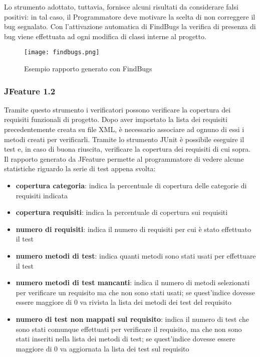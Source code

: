 \documentclass[a4paper,11pt]{article}
\begin{document}
Lo strumento adottato, tuttavia, fornisce alcuni risultati da considerare falsi positivi: in tal caso, il Programmatore deve motivare la scelta di non correggere il bug segnalato. 
Con l'attivazione automatica di FindBugs la verifica di presenza di bug viene effettuata ad ogni modifica di classi interne al progetto.
\begin{figure}[h!]
\begin{center}
\texttt{[image: findbugs.png]}
\end{center}
\caption{Esempio rapporto generato con FindBugs}
\end{figure}

\subsubsection{JFeature 1.2}

Tramite questo strumento i verificatori possono verificare la copertura dei requisiti funzionali di progetto. Dopo aver importato la lista dei requisiti precedentemente creata su file XML, 
\`e necessario associare ad ognuno di essi i metodi creati per verificarli. Tramite lo strumento JUnit \`e possibile eseguire il test e, in caso di buona riuscita, verificare la copertura
dei requisiti di cui sopra. Il rapporto generato da JFeature permette al programmatore di vedere alcune statistiche riguardo la serie di test appena svolta:
\begin{itemize}
\item \textbf{copertura categoria}: indica la percentuale di copertura delle categorie di requisiti indicata
\item \textbf{copertura requisiti}: indica la percentuale di copertura sui requisiti
\item \textbf{numero di requisiti}: indica il numero di requisiti per cui \`e stato effettuato il test
\item \textbf{numero metodi di test}: indica quanti metodi sono stati usati per effettuare il test 
\item \textbf{numero metodi di test mancanti}: indica il numero di metodi selezionati per verificare un requisito ma che non sono stati usati; se quest'indice dovesse essere maggiore di 0 va rivista
la lista dei metodi dei test del requisito
\item \textbf{numero di test non mappati sul requisito}: indica il numero di test che sono stati comunque effettuati per verificare il requisito, ma che non sono stati inseriti nella lista dei metodi di test;
se quest'indice dovesse essere maggiore di 0 va aggiornata la lista dei test sul requisito
\end{itemize}
\end{document}

